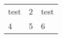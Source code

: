 \documentclass{article}
\begin{document}
\begin{tabular}{ p{1pt} | m{1pt} | b{1pt} }
test & 2 & test \\
4 & 5 & 6 \\
\end{tabular}
\end{document}
